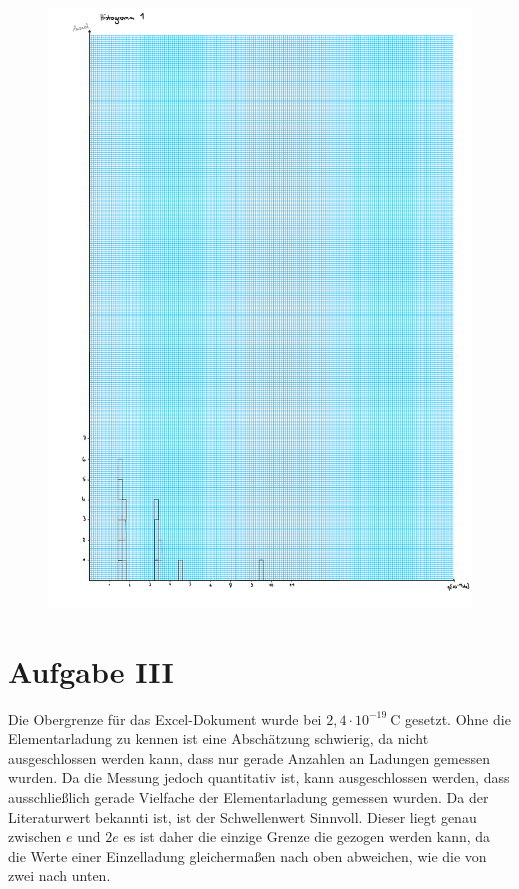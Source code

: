 \begin{figure}[h!]
    \begin{center}
        \includegraphics[width=.95\textwidth]{Histogramm22.pdf}
    \end{center}
\end{figure}

\newpage
\section{Aufgabe III}

Die Obergrenze für das Excel-Dokument wurde bei $2,4 \cdot 10^{-19}\ \text{C}$ gesetzt.
Ohne die Elementarladung zu kennen ist eine Abschätzung schwierig, da nicht ausgeschlossen werden kann,
dass nur gerade Anzahlen an Ladungen gemessen wurden. Da die Messung jedoch quantitativ ist,
kann ausgeschlossen werden, dass ausschließlich gerade Vielfache der Elementarladung gemessen wurden.
Da der Literaturwert bekannti ist, ist der Schwellenwert Sinnvoll. Dieser liegt genau zwischen $e$ und $2e$
es ist daher die einzige Grenze die gezogen werden kann, da die Werte einer Einzelladung gleichermaßen nach oben abweichen,
wie die von zwei nach unten.


